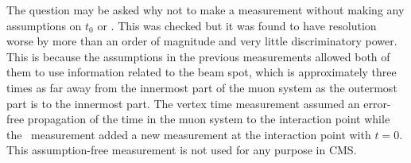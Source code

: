 

The question may be asked why not to make a measurement without making any assumptions on $t_0$ or \invbeta. This was checked but it was found to have
resolution worse by more than an order of magnitude and very little discriminatory power.
This is because the assumptions in the previous measurements allowed both of them to use information
related to the beam spot, which is approximately three times as far away from the innermost part of the muon system as the outermost part is to the innermost part.
The vertex time measurement assumed an error-free propagation of the time in the muon system to the interaction point while the \invbeta\ measurement
added a new measurement at the interaction point with $t = 0$. This assumption-free measurement is not used for any purpose in CMS.


